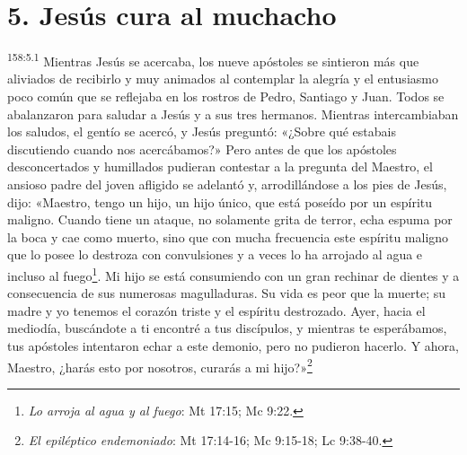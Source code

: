 {\section*{5. Jesús cura al muchacho}
\par 
\textsuperscript{158:5.1} Mientras Jesús se acercaba, los nueve apóstoles se sintieron más que aliviados de recibirlo y muy animados al contemplar la alegría y el entusiasmo poco común que se reflejaba en los rostros de Pedro, Santiago y Juan. Todos se abalanzaron para saludar a Jesús y a sus tres hermanos. Mientras intercambiaban los saludos, el gentío se acercó, y Jesús preguntó: «¿Sobre qué estabais discutiendo cuando nos acercábamos?» Pero antes de que los apóstoles desconcertados y humillados pudieran contestar a la pregunta del Maestro, el ansioso padre del joven afligido se adelantó y, arrodillándose a los pies de Jesús, dijo: «Maestro, tengo un hijo, un hijo único, que está poseído por un espíritu maligno. Cuando tiene un ataque, no solamente grita de terror, echa espuma por la boca y cae como muerto, sino que con mucha frecuencia este espíritu maligno que lo posee lo destroza con convulsiones y a veces lo ha arrojado al agua e incluso al fuego\footnote{\textit{Lo arroja al agua y al fuego}: Mt 17:15; Mc 9:22.}. Mi hijo se está consumiendo con un gran rechinar de dientes y a consecuencia de sus numerosas magulladuras. Su vida es peor que la muerte; su madre y yo tenemos el corazón triste y el espíritu destrozado. Ayer, hacia el mediodía, buscándote a ti encontré a tus discípulos, y mientras te esperábamos, tus apóstoles intentaron echar a este demonio, pero no pudieron hacerlo. Y ahora, Maestro, ¿harás esto por nosotros, curarás a mi hijo?»\footnote{\textit{El epiléptico endemoniado}: Mt 17:14-16; Mc 9:15-18; Lc 9:38-40.}

}
